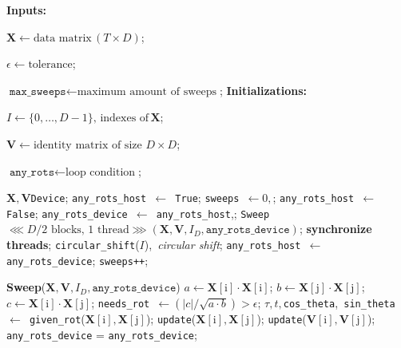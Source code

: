 \documentclass[a4paper]{article}
\begin{document}
\begin{algorithm}
    \caption{CUDA based One-Sided Jacobi implementation}
    \begin{algorithmic}[1]
        \State \textbf{Inputs:}\par $\mathbf{X} \gets \text{data matrix}\, (T \times D)$; \par
        $\epsilon \gets \text{tolerance}$; \par
        $\texttt{max\_sweeps} \gets \text{maximum amount of sweeps}$;
        \State \textbf{Initializations:}\par
        $I \gets \{0,\dots,D-1\},\, \text{indexes of}\, \mathbf{X}$;\par
        $\mathbf{V} \gets \text{identity matrix of size }D\times D$;\par
        $\texttt{any\_rots} \gets \text{loop condition}$;\par
        \State {}$\mathbf{X}, \mathbf{V}$\texttt{Device};
        \State \texttt{any\_rots\_host }$\gets$\texttt{ True};
        \State \texttt{sweeps }$\gets 0,$;
            \State \texttt{any\_rots\_host }$\gets$\texttt{ False};
            \State \texttt{any\_rots\_device }$\gets$\texttt{ any\_rots\_host},;
                \State \texttt{Sweep }$\lll D/2\text{ blocks, }1\text{ thread}\ggg(\mathbf{X},\mathbf{V},I_D,\texttt{any\_rots\_device})$;
                \State \textbf{synchronize threads};
                \State \texttt{circular\_shift}($I$),\, \textit{circular shift};
            \EndFor
            \State \texttt{any\_rots\_host }$\gets$\texttt{ any\_rots\_device};
            \State \texttt{sweeps++};
        \EndWhile
    \end{algorithmic}
\end{algorithm}

\begin{algorithm}
    \caption{\texttt{Sweep} kernel}
    \begin{algorithmic}[1]
        \State \textbf{Sweep}($\mathbf{X},\mathbf{V},I_D,\texttt{any\_rots\_device}$)
            \State $a \gets \mathbf{X}[\text{i}] \cdot \mathbf{X}[\text{i}]$;
            \State $b \gets \mathbf{X}[\text{j}] \cdot \mathbf{X}[\text{j}]$;
            \State $c \gets \mathbf{X}[\text{i}] \cdot \mathbf{X}[\text{j}]$;
            \State \texttt{needs\_rot }$\gets(|c|/\sqrt{a\cdot b}) > \epsilon$;
                \State $\tau, t,$\texttt{cos\_theta},\texttt{ sin\_theta }$\gets $\texttt{ given\_rot}($\mathbf{X}[\text{i}], \mathbf{X}[\text{j}]$);
                \State \texttt{update}($\mathbf{X}[\text{i}], \mathbf{X}[\text{j}]$);
                \State \texttt{update}($\mathbf{V}[\text{i}], \mathbf{V}[\text{j}]$);
                \State \texttt{any\_rots\_device} = \texttt{any\_rots\_device};
            \EndIf
        \EndFor
    \end{algorithmic}
\end{algorithm}
\end{document}
